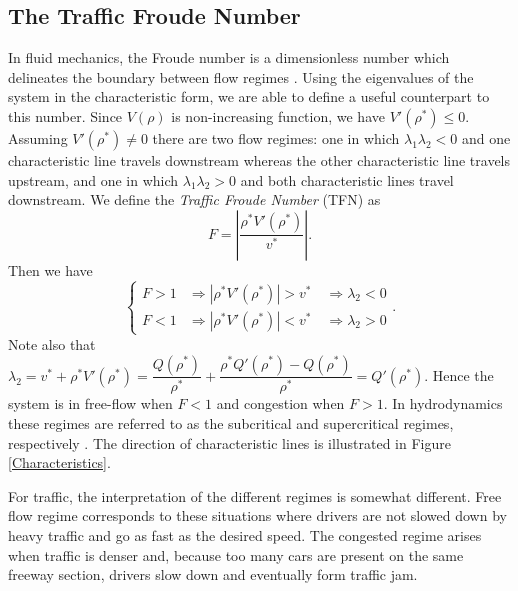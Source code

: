 \documentclass[a4paper, 10pt, conference]{ieeeconf}      %
\begin{document}
\subsection{The Traffic Froude Number}
In fluid mechanics, the Froude number is a dimensionless number which delineates the boundary between flow regimes \cite{Sturm, litrico2009modeling}. Using the eigenvalues of the system in the characteristic form, we are able to define a useful counterpart to this number. 
Since {\footnotesize $V(\rho)$} is non-increasing function, we have {\footnotesize $V'(\rho^*) \leq 0$}. Assuming {\footnotesize$V'(\rho^*) \neq 0$} there are two flow regimes: one in which {\footnotesize$\lambda_1 \lambda_2 < 0$} and one characteristic line travels downstream whereas the other characteristic line travels upstream, and one in which {\footnotesize$\lambda_1 \lambda_2 > 0$} and both characteristic lines travel downstream. We define the \textit{Traffic Froude Number} (TFN) as
{\footnotesize
\begin{equation}
F = \left\lvert\dfrac{\rho^*V'( \rho^*)}{v^*}\right\rvert.
\end{equation}
}
Then we have
{\footnotesize
\begin{equation*}
\begin{cases}
F > 1 &\Rightarrow |\rho^*V'(\rho^*)| > v^* \quad \Rightarrow \lambda_2  <0 \\
F < 1 &\Rightarrow |\rho^*V'(\rho^*)| < v^* \quad \Rightarrow \lambda_2 > 0
\end{cases}.
\end{equation*}
}
Note also that {\footnotesize$\lambda_2 = v^* + \rho^* V'( \rho^*) = \dfrac{Q(\rho^*)}{\rho^*} + \dfrac{\rho^*Q'(\rho^*)-Q(\rho^*)}{\rho^*} = Q'(\rho^*)$}. Hence the system is in free-flow when $F<1$ and congestion when $F>1$. In hydrodynamics these regimes are referred to as the subcritical and supercritical regimes, respectively \cite{litrico2009modeling}. The direction of characteristic lines is illustrated in Figure \ref{Characteristics}.

For traffic, the interpretation of the different regimes is somewhat different. Free flow regime corresponds to these situations where drivers are not slowed down by heavy traffic and go as fast as the desired speed. The congested regime arises when traffic is denser and, because too many cars are present on the same freeway section, drivers slow down and eventually form traffic jam.
\end{document}
